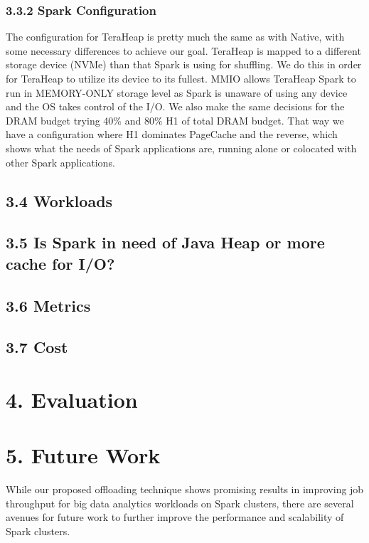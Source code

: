 \documentclass[twocolumn,10pt]{asme2e}
\begin{document}
\subsubsection*{3.3.2 Spark Configuration}
The configuration for TeraHeap is pretty much the same as with Native, with some necessary differences to achieve our goal. TeraHeap is mapped to a different storage device (NVMe) than that Spark is using for shuffling. We do this in order for TeraHeap to utilize its device to its fullest. MMIO allows TeraHeap Spark to run in MEMORY-ONLY storage level as Spark is unaware of using any device and the OS takes control of the I/O. We also make the same decisions for the DRAM budget trying 40\% and 80\% H1 of total DRAM budget. That way we have a configuration where H1 dominates PageCache and the reverse, which shows what the needs of Spark applications are, running alone or colocated with other Spark applications.   

\subsection*{3.4 Workloads}

\subsection*{3.5 Is Spark in need of Java Heap or more cache for I/O?}

\subsection*{3.6 Metrics}

\subsection*{3.7 Cost}

\section*{4. Evaluation}

\section*{5. Future Work}

While our proposed offloading technique shows promising results in improving job throughput for big data analytics workloads on Spark clusters, there are several avenues for future work to further improve the performance and scalability of Spark clusters. 
\end{document}
